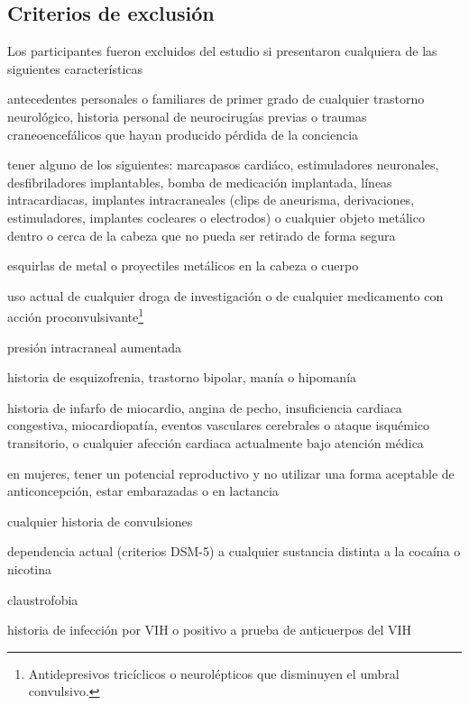 \subsection{Criterios de exclusión}
Los participantes fueron excluidos del estudio si presentaron cualquiera de las siguientes características
\begin{enumerate*}[label=\emph{\alph*}), before=\unskip{: }, itemjoin={{; }}, itemjoin*={{, o }}]
    \item antecedentes personales o familiares de primer grado de cualquier trastorno neurológico, historia personal de neurocirugías previas o traumas craneoencefálicos que hayan producido pérdida de la conciencia
    \item tener alguno de los siguientes: marcapasos cardiáco, estimuladores neuronales, desfibriladores implantables, bomba de medicación implantada, líneas intracardiacas, implantes intracraneales (clips de aneurisma, derivaciones, estimuladores, implantes cocleares o electrodos) o cualquier objeto metálico dentro o cerca de la cabeza que no pueda ser retirado de forma segura
    \item esquirlas de metal o proyectiles metálicos en la cabeza o cuerpo
    \item uso actual de cualquier droga de investigación o de cualquier medicamento con acción proconvulsivante\footnote{Antidepresivos tricíclicos o neurolépticos que disminuyen el umbral convulsivo.}
    \item presión intracraneal aumentada
    \item historia de esquizofrenia, trastorno bipolar, manía o hipomanía
    \item historia de infarfo de miocardio, angina de pecho, insuficiencia cardiaca congestiva, miocardiopatía, eventos vasculares cerebrales o ataque isquémico transitorio, o cualquier afección cardiaca actualmente bajo atención médica
    \item en mujeres, tener un potencial reproductivo y no utilizar una forma aceptable de anticoncepción, estar embarazadas o en lactancia
    \item cualquier historia de convulsiones
    \item dependencia actual (criterios DSM-5) a cualquier sustancia distinta a la cocaína o nicotina
    \item claustrofobia
    \item historia de infección por VIH o positivo a prueba de anticuerpos del VIH
\end{enumerate*}

